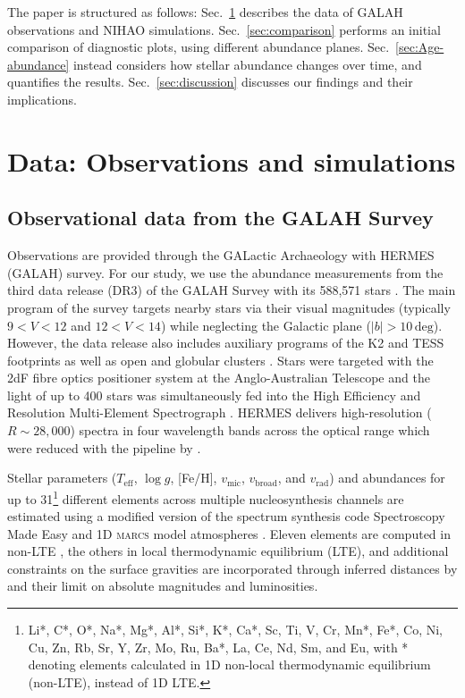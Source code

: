 \documentclass[fleqn,usenatbib]{mnras}
\begin{document}
The paper is structured as follows: Sec.~\ref{sec:data} describes the data of GALAH observations and NIHAO simulations. Sec.~\ref{sec:comparison} performs an initial comparison of diagnostic plots, using different abundance planes. Sec.~\ref{sec:Age-abundance} instead considers how stellar abundance changes over time, and quantifies the results. Sec.~\ref{sec:discussion} discusses our findings and their implications.

\section{Data: Observations and simulations} \label{sec:data}

\subsection{Observational data from the GALAH Survey}\label{sec:obs_data}

Observations are provided through the GALactic Archaeology with HERMES (GALAH) survey. For our study, we use the abundance measurements from the third data release (DR3) of the GALAH Survey with its 588,571 stars \citep{Buder2021}. The main program of the survey targets nearby stars via their visual magnitudes (typically $9 < V < 12$ and $12 < V < 14$) while neglecting the Galactic plane ($\vert b \vert > 10\,\mathrm{deg}$). However, the data release also includes auxiliary programs of the K2 and TESS footprints \citep{Sharma2018, Sharma2019} as well as open and globular clusters \cite[for more details see][]{Buder2021}. Stars were targeted with the 2dF fibre optics positioner system at the Anglo-Australian Telescope \citep{Heijmans2012, Farrell2014} and the light of up to 400 stars was simultaneously fed into the High Efficiency and Resolution Multi-Element Spectrograph \citep[HERMES,][]{Barden2010, Sheinis2015}. HERMES delivers high-resolution ($R \sim 28,000$) spectra in four wavelength bands across the optical range which were reduced with the pipeline by \citep{Kos2017}.

Stellar parameters ($T_\text{eff}$, $\log g$, [Fe/H], $v_\text{mic}$, $v_\text{broad}$, and $v_\text{rad}$) and abundances for up to 31\footnote{Li*, C*, O*, Na*, Mg*, Al*, Si*, K*, Ca*, Sc, Ti, V, Cr, Mn*, Fe*, Co, Ni, Cu, Zn, Rb, Sr, Y, Zr, Mo, Ru, Ba*, La, Ce, Nd, Sm, and Eu, with * denoting elements calculated in 1D non-local thermodynamic equilibrium (non-LTE), instead of 1D LTE.} different elements across multiple nucleosynthesis channels are estimated using a modified version of the spectrum synthesis code Spectroscopy Made Easy \citep[\textsc{sme}][]{Valenti1996, Piskunov2017} and 1D \textsc{marcs} model atmospheres \citep{Gustafsson2008}. Eleven elements are computed in non-LTE \citep{Amarsi2020}, the others in local thermodynamic equilibrium (LTE), and additional constraints on the surface gravities are incorporated through inferred distances by \citet{BailerJones2021} and their limit on absolute magnitudes and luminosities.
\end{document}
